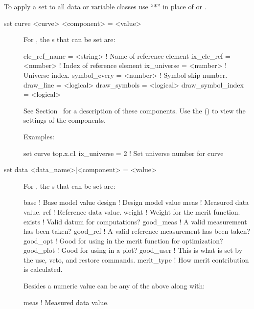 {{To apply a set to all data or variable classes use ``*''
in place of  or .



\begin{description}

\item[set curve <curve> <component> = <value>] \Newline

For , the s that can be set are:
\begin{example}
  ele_ref_name      = <string>  ! Name of reference element
  ix_ele_ref        = <number>  ! Index of reference element
  ix_universe       = <number>  ! Universe index.
  symbol_every      = <number>  ! Symbol skip number.
  draw_line         = <logical> 
  draw_symbols      = <logical> 
  draw_symbol_index = <logical> 
\end{example}
See Section~ for a description of these components.
Use the  () to view the settings of the
components.

Examples:
\begin{example}
  set curve top.x.c1 ix_universe = 2  ! Set universe number for curve
\end{example}


\item[set data <data\_name>|<component> = <value>] \Newline

For , the s that can be set are:
\begin{example}
  base        ! Base model value
  design      ! Design model value
  meas        ! Measured data value.
  ref         ! Reference data value.
  weight      ! Weight for the merit function.
  exists      ! Valid datum for computations?
  good_meas   ! A valid measurement has been taken?
  good_ref    ! A valid reference measurement has been taken?
  good_opt    ! Good for using in the merit function for optimization?
  good_plot   ! Good for using in a plot?
  good_user   ! This is what is set by the use, veto, and restore commands.
  merit_type  ! How merit contribution is calculated.
\end{example}
Besides a numeric value  can be any of the above along with:
\begin{example}
  meas        ! Measured data value.
\end{example}


\end{description}}}
